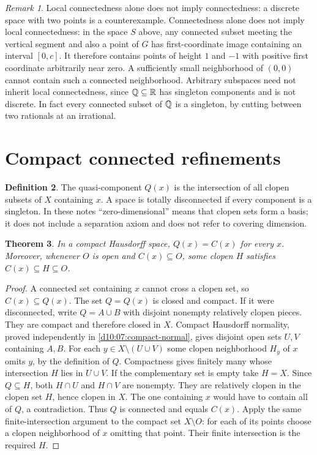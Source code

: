 \documentclass[11pt,oneside,openany]{book}
\newtheorem{theorem}{Theorem}[chapter]
\theoremstyle{definition}
\newtheorem{definition}[theorem]{Definition}
\theoremstyle{remark}
\newtheorem{remark}[theorem]{Remark}
\newcommand{\R}{\mathbb R}\newcommand{\C}{\mathbb C}
\begin{document}
\begin{remark}\label{d10:06:local-limitations}
Local connectedness alone does not imply connectedness: a discrete space with two points is a counterexample. Connectedness alone does not imply local connectedness: in the space $S$ above, any connected subset meeting the vertical segment and also a point of $G$ has first-coordinate image containing an interval $[0,c]$. It therefore contains points of height $1$ and $-1$ with positive first coordinate arbitrarily near zero. A sufficiently small neighborhood of $(0,0)$ cannot contain such a connected neighborhood. Arbitrary subspaces need not inherit local connectedness, since $\Q\subseteq\R$ has singleton components and is not discrete. In fact every connected subset of $\mathbb Q$ is a singleton, by cutting between two rationals at an irrational.
\end{remark}

\section{Compact connected refinements}
\begin{definition}\label{d10:06:quasicomponent}
The quasi-component $Q(x)$ is the intersection of all clopen subsets of $X$ containing $x$. A space is totally disconnected if every component is a singleton. In these notes ``zero-dimensional'' means that clopen sets form a basis; it does not include a separation axiom and does not refer to covering dimension.
\end{definition}

\begin{theorem}\label{d10:06:quasicomponent-compact}
In a compact Hausdorff space, $Q(x)=C(x)$ for every $x$. Moreover, whenever $O$ is open and $C(x)\subseteq O$, some clopen $H$ satisfies $C(x)\subseteq H\subseteq O$.
\end{theorem}
\begin{proof}
A connected set containing $x$ cannot cross a clopen set, so $C(x)\subseteq Q(x)$. The set $Q=Q(x)$ is closed and compact. If it were disconnected, write $Q=A\cup B$ with disjoint nonempty relatively clopen pieces. They are compact and therefore closed in $X$. Compact Hausdorff normality, proved independently in \cref{d10:07:compact-normal}, gives disjoint open sets $U,V$ containing $A,B$. For each $y\in X\setminus(U\cup V)$ some clopen neighborhood $H_y$ of $x$ omits $y$, by the definition of $Q$. Compactness gives finitely many whose intersection $H$ lies in $U\cup V$. If the complementary set is empty take $H=X$. Since $Q\subseteq H$, both $H\cap U$ and $H\cap V$ are nonempty. They are relatively clopen in the clopen set $H$, hence clopen in $X$. The one containing $x$ would have to contain all of $Q$, a contradiction. Thus $Q$ is connected and equals $C(x)$. Apply the same finite-intersection argument to the compact set $X\setminus O$: for each of its points choose a clopen neighborhood of $x$ omitting that point. Their finite intersection is the required $H$.
\end{proof}
\end{document}
